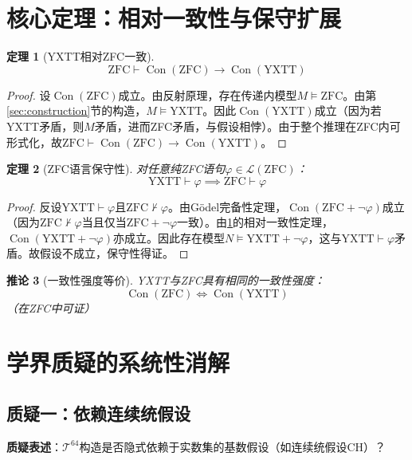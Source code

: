 \documentclass[12pt,a4paper]{article}
\newcommand{\vModels}{\vDash}
\theoremstyle{plain}
\newtheorem{theorem}{定理}[section]
\newtheorem{corollary}[theorem]{推论}
\theoremstyle{definition}
\newcommand{\Tsixtyfour}{\mathcal{T}^{64}}
\newcommand{\YXTT}{\mathrm{YXTT}}
\newcommand{\ZFC}{\mathrm{ZFC}}
\newcommand{\Con}{\operatorname{Con}}
\begin{document}
\section{核心定理：相对一致性与保守扩展}
\label{sec:main_theorems}
 
\begin{theorem}[YXTT相对ZFC一致]\label{thm:relative_consistency}
\[
\boxed{\ZFC \vdash \Con(\ZFC) \to \Con(\YXTT)}
\]
\end{theorem}
\begin{proof}
设$\Con(\ZFC)$成立。由反射原理，存在传递内模型$M\vDash\ZFC$。由第\ref{sec:construction}节的构造，$M\vModels\YXTT$。因此$\Con(\YXTT)$成立（因为若YXTT矛盾，则$M$矛盾，进而ZFC矛盾，与假设相悖）。由于整个推理在ZFC内可形式化，故$\ZFC\vdash\Con(\ZFC)\to\Con(\YXTT)$。
\end{proof}
 
\begin{theorem}[ZFC语言保守性]\label{thm:conservative}
对任意纯ZFC语句$\varphi\in\mathcal{L}(\ZFC)$：
\[
\boxed{\YXTT \vdash \varphi \implies \ZFC \vdash \varphi}
\]
\end{theorem}
\begin{proof}
反设$\YXTT\vdash\varphi$且$\ZFC\nvdash\varphi$。由Gödel完备性定理，$\Con(\ZFC+\neg\varphi)$成立（因为$\ZFC\nvdash\varphi$当且仅当$\ZFC+\neg\varphi$一致）。由\cref{thm:relative_consistency}的相对一致性定理，$\Con(\YXTT+\neg\varphi)$亦成立。因此存在模型$N\vModels\YXTT+\neg\varphi$，这与$\YXTT\vdash\varphi$矛盾。故假设不成立，保守性得证。
\end{proof}
 
\begin{corollary}[一致性强度等价]
YXTT与ZFC具有相同的一致性强度：
\[
\boxed{\Con(\ZFC) \iff \Con(\YXTT)}
\]
（在ZFC中可证）
\end{corollary}
 
\section{学界质疑的系统性消解}
\label{sec:objections}
 
\subsection{质疑一：依赖连续统假设}
\textbf{质疑表述}：$\Tsixtyfour$构造是否隐式依赖于实数集的基数假设（如连续统假设CH）？
 
\end{document}
